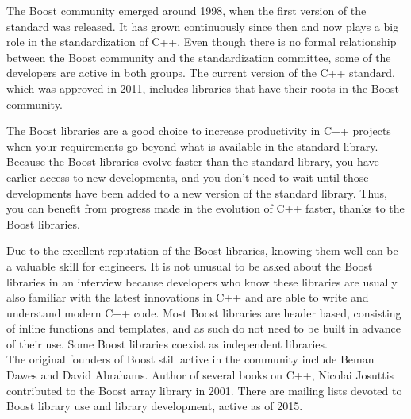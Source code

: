 The Boost community emerged around 1998, when the first version of the standard was released. It has grown continuously since then and now plays a big role in the standardization of C++. Even though there is no formal relationship between the Boost community and the standardization committee, some of the developers are active in both groups. The current version of the C++ standard, which was approved in 2011, includes libraries that have their roots in the Boost community.

The Boost libraries are a good choice to increase productivity in C++ projects when your requirements go beyond what is available in the standard library. Because the Boost libraries evolve faster than the standard library, you have earlier access to new developments, and you don’t need to wait until those developments have been added to a new version of the standard library. Thus, you can benefit from progress made in the evolution of C++ faster, thanks to the Boost libraries.

Due to the excellent reputation of the Boost libraries, knowing them well can be a valuable skill for engineers. It is not unusual to be asked about the Boost libraries in an interview because developers who know these libraries are usually also familiar with the latest innovations in C++ and are able to write and understand modern C++ code.
Most Boost libraries are header based, consisting of inline functions and templates, and as such do not need to be built in advance of their use. Some Boost libraries coexist as independent libraries.\\
The original founders of Boost still active in the community include Beman Dawes and David Abrahams. Author of several books on C++, Nicolai Josuttis contributed to the Boost array library in 2001. There are mailing lists devoted to Boost library use and library development, active as of 2015.

